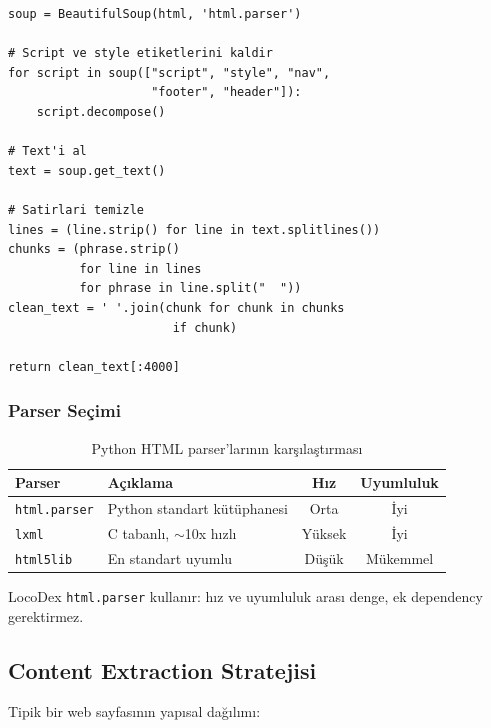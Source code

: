 \begin{lstlisting}[caption={HTML i\c{c}erik \c{c}{\i}karma (smart\_multilingual\_research.py)}, label={lst:html-parse}]
soup = BeautifulSoup(html, 'html.parser')

# Script ve style etiketlerini kaldir
for script in soup(["script", "style", "nav",
                    "footer", "header"]):
    script.decompose()

# Text'i al
text = soup.get_text()

# Satirlari temizle
lines = (line.strip() for line in text.splitlines())
chunks = (phrase.strip()
          for line in lines
          for phrase in line.split("  "))
clean_text = ' '.join(chunk for chunk in chunks
                       if chunk)

return clean_text[:4000]
\end{lstlisting}

\subsubsection{Parser Se\c{c}imi}

\begin{table}[H]
\centering
\caption{Python HTML parser'lar{\i}n{\i}n kar\c{s}{\i}la\c{s}t{\i}rmas{\i}}
\label{tab:parsers}
\begin{tabularx}{\textwidth}{lXcc}
\toprule
\color{chapterBlue}\textbf{Parser} &
\color{chapterBlue}\textbf{A\c{c}{\i}klama} &
\color{chapterBlue}\textbf{H{\i}z} &
\color{chapterBlue}\textbf{Uyumluluk} \\
\midrule
\texttt{html.parser} & Python standart k\"{u}t\"{u}phanesi & Orta & \.{I}yi \\
\texttt{lxml} & C tabanl{\i}, $\sim$10x h{\i}zl{\i} & \color{codeGreen}Y\"{u}ksek & \.{I}yi \\
\texttt{html5lib} & En standart uyumlu & D\"{u}\c{s}\"{u}k & \color{codeGreen}M\"{u}kemmel \\
\bottomrule
\end{tabularx}
\smallskip
{\small LocoDex \texttt{html.parser} kullan{\i}r: h{\i}z ve uyumluluk aras{\i} denge, ek dependency gerektirmez.}
\end{table}


\subsection{Content Extraction Stratejisi}
\label{subsec:content-strategy}

Tipik bir web sayfas{\i}n{\i}n yap{\i}sal da\u{g}{\i}l{\i}m{\i}:

